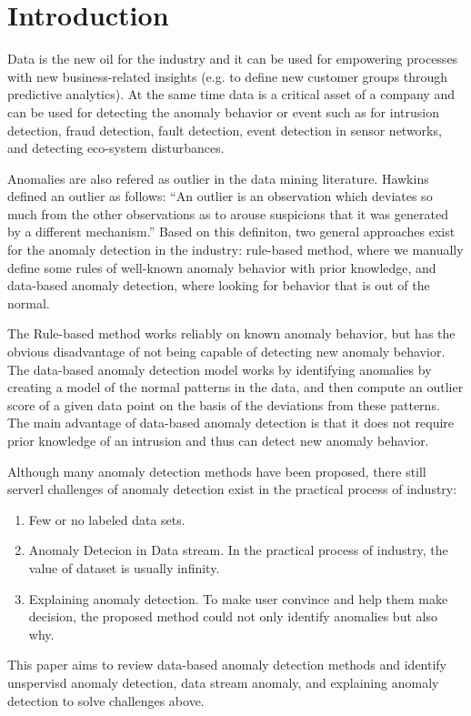 \section{Introduction}\label{sec-intro}

Data is the new oil for the industry and
it can be used for empowering processes with
new business-related insights
(e.g. to define new customer groups through predictive analytics).
At the same time data is a critical asset of a company and
can be used for detecting the anomaly behavior or event
such as for
intrusion detection,
fraud detection,
fault detection,
event detection in sensor networks,
and detecting eco-system disturbances.

Anomalies are also refered as outlier in the
data mining literature.
Hawkins~\cite{hawkins1980identification} defined
an outlier as follows:
``An outlier is an observation which
deviates so much from the other observations
as to arouse suspicions that
it was generated by a different mechanism.''
Based on this definiton,
two general approaches exist for the anomaly
detection in the industry:
rule-based method,
where we manually define some rules of
well-known anomaly behavior
with prior knowledge,
and data-based anomaly detection,
where looking for behavior that
is out of the normal.

The Rule-based method works reliably on known anomaly behavior,
but has the obvious disadvantage of not being capable of
detecting new anomaly behavior.
The data-based anomaly detection model works by
identifying anomalies by creating a model of
the normal patterns in the data,
and then compute an outlier score of a given data point
on the basis of the deviations from these patterns.
The main advantage of data-based anomaly detection is that
it does not require prior knowledge of an intrusion and
thus can detect new anomaly behavior.

Although many anomaly detection methods have been proposed,
there still serverl challenges of anomaly detection exist
in the practical  process of industry:
\begin{enumerate}
    \item Few or no labeled data sets.
    \item Anomaly Detecion in Data stream.
    In the practical process of industry,
    the value of dataset is usually infinity.
    \item Explaining anomaly detection.
    To make  user convince and help them make decision,
    the proposed method could not only identify anomalies  but also
    why.
\end{enumerate}
This paper aims to review data-based anomaly detection methods and
identify unspervisd anomaly detection,
data stream anomaly, and explaining anomaly detection
to solve challenges above.

